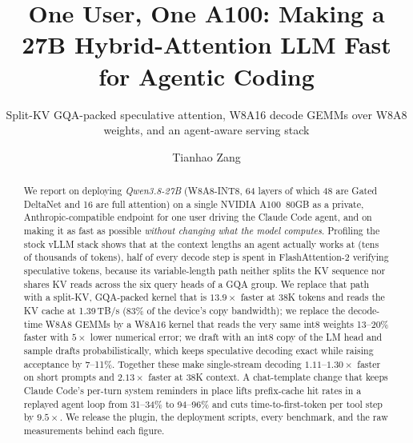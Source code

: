 \documentclass[acmtog,nonacm,screen]{acmart}
\begin{document}
\title{One User, One A100: Making a 27B Hybrid-Attention LLM Fast for Agentic Coding}
\subtitle{Split-KV GQA-packed speculative attention, W8A16 decode GEMMs over W8A8 weights, and an agent-aware serving stack}

\author{Tianhao Zang}
\authorsaddresses{}

\begin{abstract}
We report on deploying \emph{Qwen3.8-27B} (W8A8-INT8, 64 layers of which 48 are Gated DeltaNet and 16 are
full attention) on a single NVIDIA A100~80GB as a private, Anthropic-compatible endpoint for one user driving the
Claude Code agent, and on making it as fast as possible \emph{without changing what the model computes}. Profiling
the stock vLLM stack shows that at the context lengths an agent actually works at (tens of thousands of tokens), half
of every decode step is spent in FlashAttention-2 verifying speculative tokens, because its variable-length path
neither splits the KV sequence nor shares KV reads across the six query heads of a GQA group. We replace that path
with a split-KV, GQA-packed kernel that is $13.9\times$ faster at 38K tokens and reads the KV cache at
1.39\,TB/s (83\% of the device's copy bandwidth); we replace the decode-time W8A8 GEMMs by a W8A16 kernel that reads
the very same int8 weights 13--20\% faster with $5\times$ lower numerical error; we draft with an int8 copy of the
LM head and sample drafts probabilistically, which keeps speculative decoding exact while raising acceptance by
7--11\%. Together these make single-stream decoding $1.11$--$1.30\times$ faster on short prompts and $2.13\times$
faster at 38K context. A chat-template change that keeps Claude Code's per-turn system reminders in place lifts
prefix-cache hit rates in a replayed agent loop from 31--34\% to 94--96\% and cuts time-to-first-token per tool step
by $9.5\times$. We release the plugin, the deployment scripts, every benchmark, and the raw measurements behind each
figure.
\end{abstract}

\end{document}
